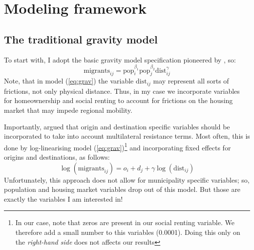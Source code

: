 \documentclass[fleqn,10pt]{SelfArx} %
\begin{document}
        \section{Modeling framework}

        \subsection{The traditional gravity model}

        To start with, I adopt the basic gravity model specification pioneered by
        \citet{tinbergen1962shaping}, so:
        \begin{equation}
          \text{migrants}_{ij} = \text{pop}_i^{\beta_1}\text{pop}_j^{\beta_2}\text{dist}_{ij}^\gamma
          \label{eq:grav}
        \end{equation}
        Note, that in model (\ref{eq:grav}) the variable
        $\text{dist}_{ij}$ may represent all sorts of frictions, not
        only physical distance. Thus, in my case we incorporate
        variables for homeownership and social renting to account for
        frictions on the housing market that may impede regional
        mobility.

        Importantly, \citet{anderson2003gravity} argued that origin
        and destination specific variables should be incorporated to
        take into account multilateral resistance terms. Most often,
        this is done by log-linearising model
        (\ref{eq:grav})\footnote{In our case, note that zeros are
          present in our social renting variable. We therefore add a
          small number to this variables (0.0001). Doing this only on
          the \emph{right-hand side} does not affects our results} and
        incorporating fixed effects for origins and destinations, as
        follows:
        \begin{equation}
          \log(\text{migrants}_{ij}) = o_i + d_j +  \gamma\log(\text{dist}_{ij})
          \label{eq:gravfixed}
        \end{equation} 
        Unfortunately, this approach does not allow for municipality
        specific variables; so, population and housing market
        variables drop out of this model. But those are exactly the
        variables I am  interested in!
\end{document}
